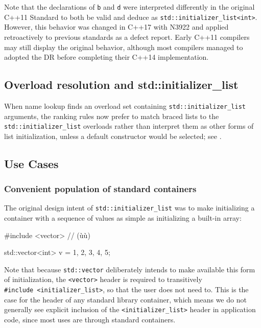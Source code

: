 \noindent Note that the declarations of \lstinline!b! and \lstinline!d! were interpreted
differently in the original C++11 Standard to both be valid and deduce
as \lstinline!std::initializer_list<int>!. However, this behavior was
changed in C++17 with N3922 and applied retroactively to previous
standards as a defect report. Early C++11 compilers may still display
the original behavior, although most compilers managed to adopted the DR
before completing their C++14 implementation.

\subsection[Overload resolution and \lstinline!std::initializer_list!]{Overload resolution and {\SubsubsecCode std::initializer\_list}}\label{overload-resolution-and-std::initializer_list}

When name lookup finds an overload set containing
\lstinline!std::initializer_list! arguments, the ranking rules now prefer
to match braced lists to the \lstinline!std::initializer_list! overloads
rather than interpret them as other forms of list initialization, unless
a default constructor would be selected; see .

\subsection[Use Cases]{Use Cases}\label{use-cases-initlist}

\subsubsection[Convenient population of standard containers]{Convenient population of standard containers}\label{convenient-population-of-standard-containers}

The original design intent of \lstinline!std::initializer_list! was to
make initializing a container with a sequence of values as simple as
initializing a built-in array:

\begin{emcppslisting}[emcppsbatch=e5]
#include <vector>  // (ù{}ù)

std::vector<int> v = {1, 2, 3, 4, 5};
\end{emcppslisting}
    

\noindent Note that because \lstinline!std::vector! deliberately intends to make
available this form of initialization, the \lstinline!<vector>! header is
required to transitively
\lstinline!#include!~\lstinline!<initializer_list>!, so that the user does
not need to. This is the case for the header of any standard library
container, which means we do not generally see explicit inclusion of the
\lstinline!<initializer_list>! header in application code, since most uses
are through standard containers.

